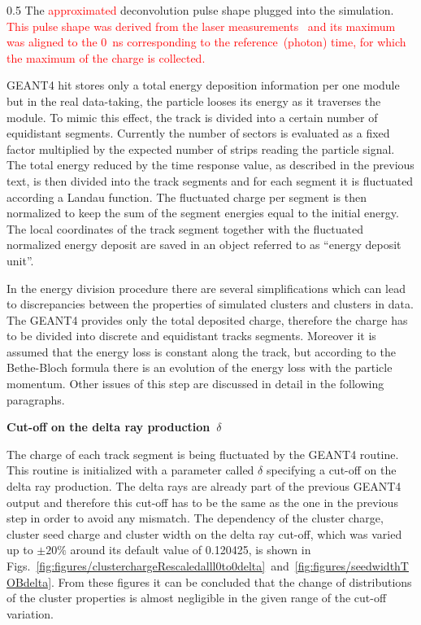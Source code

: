                  {0.5}       %
                 { The \textcolor{red}{approximated} deconvolution pulse shape plugged into the simulation. \textcolor{red}{This pulse shape was derived from the laser measurements~\cite{Delaere:1061284} and its maximum was aligned to the 0~ns  corresponding to the reference~(photon) time, for which the maximum of the charge is collected.}}

GEANT4 hit stores only a total energy deposition information per one module but in the real data-taking, the particle looses its energy as it traverses the module. To mimic this effect, the track is divided into a certain number of equidistant segments. Currently the number of sectors is evaluated as a fixed factor multiplied by the expected number of strips reading the particle signal. The total energy reduced by the time response value, as described in the previous text, is then divided into the track segments and for each segment it is fluctuated according a Landau function. The fluctuated charge per segment is then normalized to keep the sum of the segment energies equal to the initial energy. The local coordinates of the track segment together with the fluctuated normalized energy deposit are saved in an object referred to as ``energy deposit unit''.

In the energy division procedure there are several simplifications which can lead to discrepancies between the properties of simulated clusters and clusters in data. The GEANT4 provides only the total deposited charge, therefore the charge has to be divided into discrete and equidistant tracks segments. Moreover it is assumed that the energy loss is constant along the track, but according to the Bethe-Bloch formula there is an evolution of the energy loss with the particle momentum. Other issues of this step are discussed in detail in the following paragraphs.

\textbf{Cut-off on the delta ray production~$\delta$ }

The charge of each track segment is being fluctuated by the GEANT4 routine. This routine is initialized with a parameter called $\delta$ specifying a cut-off on the delta ray production. The delta rays are already part of the previous GEANT4 output and therefore this cut-off has to be the same as the one in the previous step in order to avoid any mismatch. The dependency of the cluster charge, cluster seed charge and cluster width on the delta ray cut-off, which was varied up to $\pm 20\%$ around its default value of 0.120425, is shown in Figs.~\ref{fig:figures/clusterchargeRescaledalll0to0delta}~and~\ref{fig:figures/seedwidthTOBdelta}. From these figures it can be concluded that the change of distributions of the cluster properties is almost negligible in the given range of the cut-off variation. 


